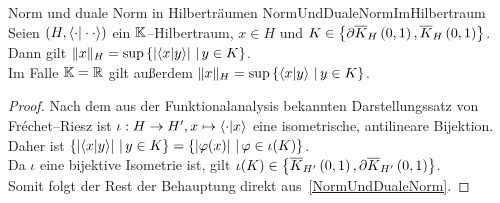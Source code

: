 \begin{korollar}{Norm und duale Norm in Hilberträumen}
                {NormUndDualeNormImHilbertraum}
Seien $(H, \left\langle \cdot |\cdot\cdot\right\rangle)$ ein $\mathbb{K}$--Hilbertraum, $x \in H$ und
$K \in \left\{ \partial \overline K_{H}\left(0, 1\right),\overline K_{H}\left(0, 1\right)\right\}$.\\
Dann gilt $\lVert x\rVert_H = \sup\left\{\left|\left\langle x |y\right\rangle\right|\,|\,y \in K\right\}$.\\
Im Falle $\mathbb{K} = \mathbb{R}$ gilt außerdem $\lVert x\rVert_H = \sup\left\{\left\langle x |y\right\rangle\,|\,y \in K\right\}$.
\end{korollar}
\begin{proof}
Nach dem aus der Funktionalanalysis bekannten Darstellungssatz von
Fréchet--Riesz ist $\iota : H \rightarrow H', x \mapsto \left\langle \cdot |x\right\rangle$
eine isometrische, antilineare Bijektion.\\
Daher ist $\left\{\left|\left\langle x |y\right\rangle\right|\,|\,y \in K\right\} 
= \left\{\left|\varphi(x)\right|\,|\,\varphi \in \iota(K)\right\}$.\\
Da $\iota$ eine bijektive Isometrie ist, gilt 
$\iota(K) \in \left\{\overline K_{H'}\left(0, 1\right), \partial \overline K_{H'}\left(0, 1\right)\right\}$.\\
Somit folgt der Rest der Behauptung direkt aus~\ref{NormUndDualeNorm}.
\end{proof}